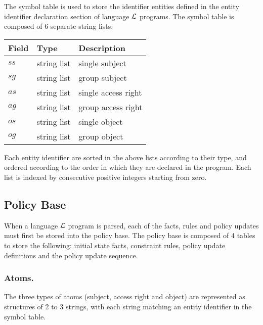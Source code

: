 \documentclass[global,twocolumn,final]{svjour}
\newenvironment{vquote}
  {\begin{list}{}{\leftmargin 1em}\item[]}
  {\end{list}}
\begin{document}
      The symbol table is used to store the identifier entities defined in
      the entity identifier declaration section of language ${\cal L}$
      programs. The symbol table is composed of 6 separate string lists:

      \begin{vquote}
        \begin{tabular}[t]{|l|l|l|}
          \hline
          \textbf{Field} & \textbf{Type} & \textbf{Description} \\
          \hline
          $ss$ & string list & single subject \\
          \hline
          $sg$ & string list & group subject \\
          \hline
          $as$ & string list & single access right \\
          \hline
          $ag$ & string list & group access right \\
          \hline
          $os$ & string list & single object \\
          \hline
          $og$ & string list & group object \\
          \hline
        \end{tabular}
      \end{vquote}

      Each entity identifier are sorted in the above lists according to
      their type, and ordered according to the order in which they are
      declared in the program. Each list is indexed by consecutive
      positive integers starting from zero.

    \subsection{Policy Base}

      When a language ${\cal L}$ program is parsed, each of the facts,
      rules and policy updates must first be stored into the policy base.
      The policy base is composed of 4 tables to store the following:
      initial state facts, constraint rules, policy update definitions and
      the policy update sequence.

      \subsubsection{Atoms.}

        The three types of atoms (subject, access right and object) are
        represented as structures of 2 to 3 strings, with each string
        matching an entity identifier in the symbol table.
\end{document}
